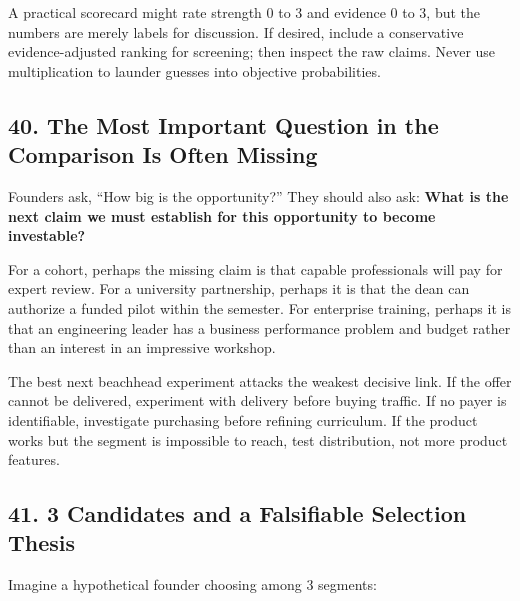 A practical scorecard might rate strength 0 to 3 and evidence 0 to 3, but the numbers are merely labels for discussion. If desired, include a conservative evidence-adjusted ranking for screening; then inspect the raw claims. Never use multiplication to launder guesses into objective probabilities.

\subsection*{40. The Most Important Question in the Comparison Is Often Missing}

Founders ask, ``How big is the opportunity?'' They should also ask: \textbf{What is the next claim we must establish for this opportunity to become investable?}

For a cohort, perhaps the missing claim is that capable professionals will pay for expert review. For a university partnership, perhaps it is that the dean can authorize a funded pilot within the semester. For enterprise training, perhaps it is that an engineering leader has a business performance problem and budget rather than an interest in an impressive workshop.

The best next beachhead experiment attacks the weakest decisive link. If the offer cannot be delivered, experiment with delivery before buying traffic. If no payer is identifiable, investigate purchasing before refining curriculum. If the product works but the segment is impossible to reach, test distribution, not more product features.

\subsection*{41. 3 Candidates and a Falsifiable Selection Thesis}

Imagine a hypothetical founder choosing among 3 segments:

